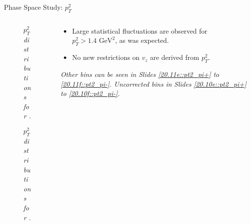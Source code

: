 \begin{frame}{Phase Space Study: $p_T^2$}
    \label{12.15::pt2}

    \begin{columns}[onlytextwidth,T]

    \begin{column}{.44\linewidth}
        \vspace{-15pt}
        \begin{center}
            \begin{figure}[t]
                \scriptsize{\textit{$p_T^2$ distributions for \ef{$\pi^-$}.}}
            \end{figure}

            \vspace{-15pt}
            \begin{figure}[t]
                \scriptsize{\textit{$p_T^2$ distributions for \ef{$\pi^+$}.}}
            \end{figure}
        \end{center}
    \end{column}

    \begin{column}{.54\linewidth}
        \begin{itemize}
            \item
                Large statistical fluctuations are observed for $p_T^2 > 1.4 \text{ GeV}^2$, as was expected.

            \vspace{12pt}
            \item
                No new restrictions on $v_z$ are derived from $p_T^2$.
        \end{itemize}

        \vspace{114pt}

        \begin{flushright}
            \tiny{\textit{
                Other bins can be seen in Slides \textcolor{efd_purple}{\ref{20.11e::pt2_pi+}} to \textcolor{efd_purple}{\ref{20.11f::pt2_pi-}}.
                Uncorrected bins in Slides \textcolor{efd_purple}{\ref{20.10e::pt2_pi+}} to \textcolor{efd_purple}{\ref{20.10f::pt2_pi-}}.
            }}
        \end{flushright}
    \end{column}

    \end{columns}
\end{frame}

